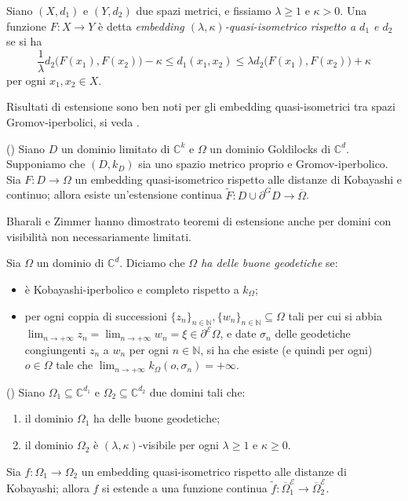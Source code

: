 \begin{defn}
    Siano $(X,d_1)$ e $(Y,d_2)$ due spazi metrici, e fissiamo $\lambda\ge 1$ e $\kappa>0$. Una funzione $F:X\longrightarrow Y$ è detta \textit{embedding $(\lambda,\kappa)$-quasi-isometrico rispetto a $d_1$ e $d_2$} se si ha
    $$\frac{1}{\lambda}d_2\big(F(x_1),F(x_2)\big)-\kappa \le d_1(x_1,x_2) \le \lambda d_2\big(F(x_1),F(x_2)\big)+\kappa$$
    per ogni $x_1,x_2\in X$.
\end{defn}

Risultati di estensione sono ben noti per gli embedding quasi-isometrici tra spazi Gromov-iperbolici, si veda \cite[Part III, Chapter H, Theorem 3.9]{BH}.

\begin{thm}
    (\cite[Theorem 1.7]{BZ1}) Siano $D$ un dominio limitato di $\mathbb{C}^k$ e $\Omega$ un dominio Goldilocks di $\mathbb{C}^d$. Supponiamo che $(D,k_D)$ sia uno spazio metrico proprio e Gromov-iperbolico. Sia $F:D\longrightarrow\Omega$ un embedding quasi-isometrico rispetto alle distanze di Kobayashi e continuo; allora esiste un'estensione continua $\tilde{F}:D\cup\partial^GD\longrightarrow\overline{\Omega}$.
\end{thm}

Bharali e Zimmer hanno dimostrato teoremi di estensione anche per domini con visibilità non necessariamente limitati.

\begin{defn}
    Sia $\Omega$ un dominio di $\mathbb{C}^d$. Diciamo che \textit{$\Omega$ ha delle buone geodetiche} se:
    \begin{itemize}
        \item è Kobayashi-iperbolico e completo rispetto a $k_\Omega$;
        \item per ogni coppia di successioni $\{z_n\}_{n\in\mathbb{N}},\{w_n\}_{n\in\mathbb{N}}\subseteq\Omega$ tali per cui si abbia $\displaystyle\lim_{n\longrightarrow+\infty}z_n=\displaystyle\lim_{n\longrightarrow+\infty}w_n=\xi\in\partial^\mathcal{E}\Omega$, e date $\sigma_n$ delle geodetiche congiungenti $z_n$ a $w_n$ per ogni $n\in\mathbb{N}$, si ha che esiste (e quindi per ogni) $o\in\Omega$ tale che $\displaystyle\lim_{n\longrightarrow+\infty}k_\Omega(o,\sigma_n)=+\infty$.
    \end{itemize}
\end{defn}

\begin{thm}
    (\cite[Theorem 1.6]{BZ2}) Siano $\Omega_1\subseteq\mathbb{C}^{d_1}$ e $\Omega_2\subseteq\mathbb{C}^{d_2}$ due domini tali che:
    \begin{enumerate}[label={(\arabic*)}]
        \item il dominio $\Omega_1$ ha delle buone geodetiche;
        \item il dominio $\Omega_2$ è $(\lambda,\kappa)$-visibile per ogni $\lambda\ge 1$ e $\kappa\ge 0$.
    \end{enumerate}

    Sia $f:\Omega_1\longrightarrow\Omega_2$ un embedding quasi-isometrico rispetto alle distanze di Kobayashi; allora $f$ si estende a una funzione continua $\tilde{f}:\overline{\Omega}_1^\mathcal{E}\longrightarrow\overline{\Omega}_2^\mathcal{E}$.
\end{thm}

